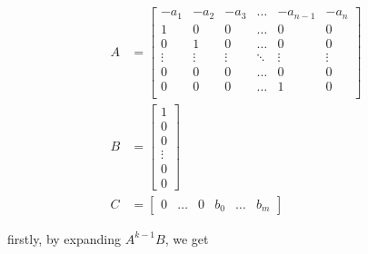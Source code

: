 \documentclass[12pt]{article}
\begin{document}
  \begin{align*}
    A &=
    \begin{bmatrix}
    -a_1   & -a_2   & -a_3   & \dots  & -a_{n-1} & -a_n   \\
    1      & 0      & 0      & \dots  & 0        & 0      \\
    0      & 1      & 0      & \dots  & 0        & 0      \\
    \vdots & \vdots & \vdots & \ddots & \vdots   & \vdots \\
    0      & 0      & 0      & \dots  & 0        & 0      \\
    0      & 0      & 0      & \dots  & 1        & 0      \\
    \end{bmatrix}
    \\
    B &=
    \begin{bmatrix}
    1 \\ 0 \\ 0 \\ \vdots \\ 0 \\ 0
    \end{bmatrix}
    \\
    C &=
    \begin{bmatrix}
    0 & \dots & 0 & b_0 & \dots & b_m
    \end{bmatrix}
  \end{align*}

  firstly, by expanding $A^{k-1}B$, we get
\end{document}
